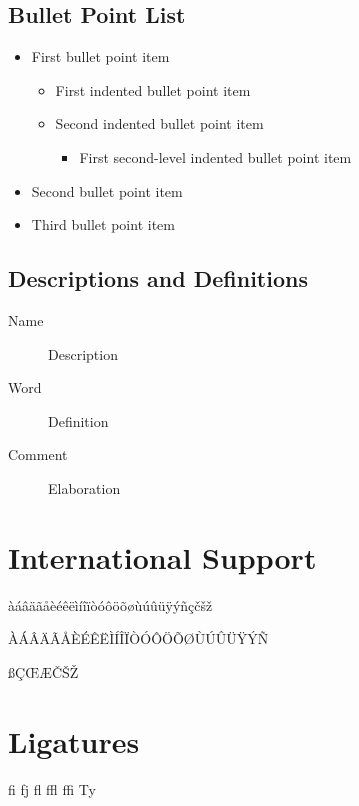\documentclass[
	11pt, %
	fleqn, %
	letterpaper, %
]{CommodoreBlueBook}
\begin{document}
\subsection{Bullet Point List}

\begin{itemize}
	\item First bullet point item
	\begin{itemize}
		\item First indented bullet point item
		\item Second indented bullet point item
		\begin{itemize}
			\item First second-level indented bullet point item
		\end{itemize}
	\end{itemize}
	\item Second bullet point item
	\item Third bullet point item
\end{itemize}

\subsection{Descriptions and Definitions}

\begin{description}
	\item[Name] Description
	\item[Word] Definition
	\item[Comment] Elaboration
\end{description}


\section{International Support}

àáâäãåèéêëìíîïòóôöõøùúûüÿýñçčšž

\noindent ÀÁÂÄÃÅÈÉÊËÌÍÎÏÒÓÔÖÕØÙÚÛÜŸÝÑ

\noindent ßÇŒÆČŠŽ


\section{Ligatures}

fi fj fl ffl ffi Ty
\end{document}
